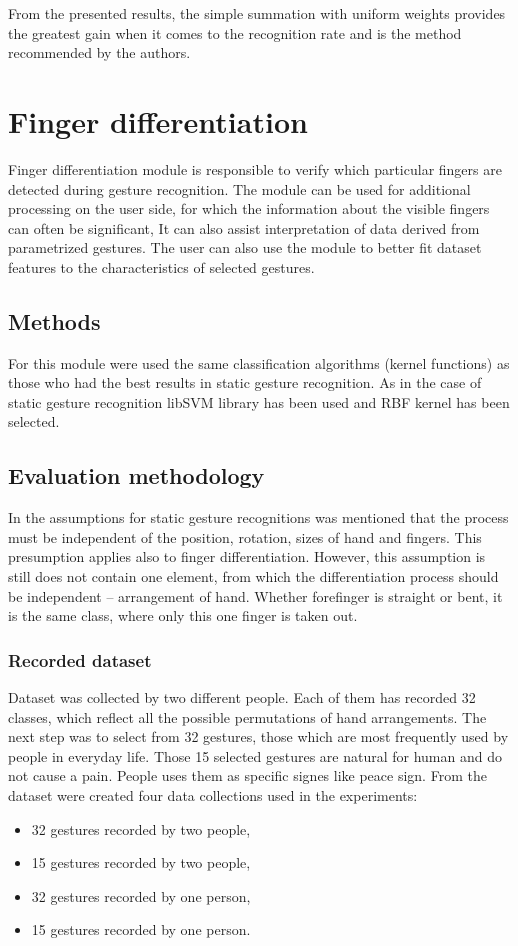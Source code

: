 From the presented results, the simple summation with uniform weights provides the greatest gain when it comes to the recognition rate and is the method recommended by the authors.


\section{Finger differentiation} 
Finger differentiation module is responsible to verify which particular fingers are detected during gesture recognition. The module can be used for additional processing on the user side, for which the information about the visible fingers can often be significant, It can also assist interpretation of data derived from parametrized gestures. The user can also use the module to better fit dataset features to the characteristics of selected gestures.
\subsection{Methods}
For this module were used the same classification algorithms (kernel functions) as those who had the best results in static gesture recognition. As in the case of static gesture recognition libSVM library has been used and RBF kernel has been selected.
\subsection{Evaluation methodology}
In the assumptions for static gesture recognitions was mentioned that the process must be independent of the position, rotation, sizes of hand and fingers. This presumption applies also to finger differentiation. However, this assumption is still does not contain one element, from which the differentiation process should be independent -- arrangement of hand. Whether forefinger is straight or bent, it is the same class, where only this one finger is taken out.

\subsubsection{Recorded dataset}
Dataset was collected by two different people. Each of them has recorded 32 classes, which reflect all the possible permutations of hand arrangements. The next step was to select from 32 gestures, those which are most frequently used by people in everyday life. Those 15 selected gestures are natural for human and do not cause a pain. People uses them as specific signes like peace sign. From the dataset were created four data collections used in the experiments:
\begin{itemize}
\item 32 gestures recorded by two people,
\item 15 gestures recorded by two people,
\item 32 gestures recorded by one person,
\item 15 gestures recorded by one person.
\end{itemize}

